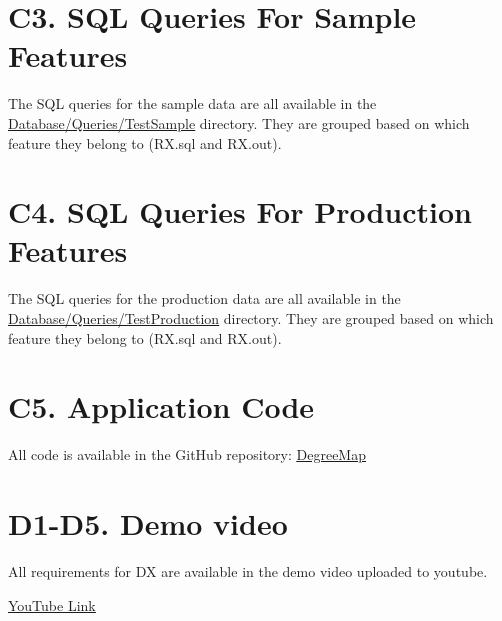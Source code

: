 \documentclass[12pt, a4paper]{article}
\begin{document}
\section*{C3. SQL Queries For Sample Features}
The SQL queries for the sample data are all available in the \underline{\href{https://github.com/Kggupta/DegreeMap/tree/main/Database/Queries/TestSample}{Database/Queries/TestSample}} directory. They are grouped based on which feature they belong to (RX.sql and RX.out).
\section*{C4. SQL Queries For Production Features}
The SQL queries for the production data are all available in the \underline{\href{https://github.com/Kggupta/DegreeMap/tree/main/Database/Queries/TestProduction}{Database/Queries/TestProduction}} directory. They are grouped based on which feature they belong to (RX.sql and RX.out).
\section*{C5. Application Code}
All code is available in the GitHub repository: \underline{\href{https://github.com/Kggupta/DegreeMap}{DegreeMap}}
\section*{D1-D5. Demo video}
All requirements for DX are available in the demo video uploaded to youtube.

\underline{\href{https://youtu.be/73rIotVdLA0}{YouTube Link}}
\end{document}
